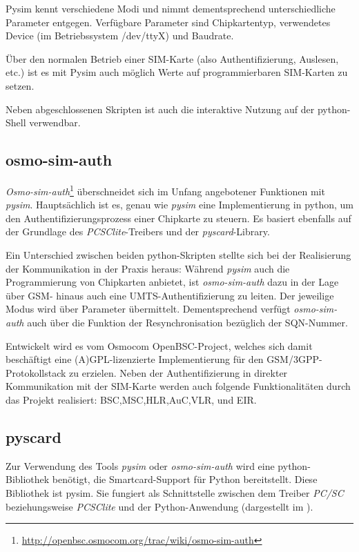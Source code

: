 Pysim kennt verschiedene Modi und nimmt dementsprechend unterschiedliche
Parameter entgegen. Verfügbare Parameter sind Chipkartentyp, verwendetes
Device (im Betriebssystem /dev/ttyX) und Baudrate\cite{pysimprince}.

Über den normalen Betrieb einer SIM-Karte (also Authentifizierung, Auslesen, etc.)
ist es mit Pysim auch möglich Werte auf programmierbaren SIM-Karten zu setzen.

Neben abgeschlossenen Skripten ist auch die interaktive Nutzung auf der
python-Shell verwendbar.

\subsection{osmo-sim-auth}
\label{subsec:osmosim}
\textit{Osmo-sim-auth}\footnote{\url{http://openbsc.osmocom.org/trac/wiki/osmo-sim-auth}}
überschneidet sich im Unfang angebotener Funktionen mit \textit{pysim}. Hauptsächlich ist es,
genau wie \textit{pysim} eine Implementierung in python, um den Authentifizierungsprozess
einer Chipkarte zu steuern. Es basiert ebenfalls auf der Grundlage des
\textit{PCSClite}-Treibers und der \textit{pyscard}-Library.

Ein Unterschied zwischen beiden python-Skripten stellte sich bei der
Realisierung der Kommunikation in der Praxis heraus:
Während \textit{pysim} auch die Programmierung von Chipkarten anbietet, ist
\textit{osmo-sim-auth} dazu in der Lage über \ac{GSM}- hinaus auch
eine \ac{UMTS}-Authentifizierung zu leiten.
Der jeweilige Modus wird über Parameter übermittelt.
Dementsprechend verfügt \textit{osmo-sim-auth} auch über die Funktion der
Resynchronisation bezüglich der \ac{SQN}-Nummer\cite{osmosimweb}.

Entwickelt wird es vom Osmocom OpenBSC-Project, welches sich damit
beschäftigt eine (A)GPL-lizenzierte Implementierung für den
GSM/3GPP-Protokollstack zu erzielen. Neben der Authentifizierung
in direkter Kommunikation mit der SIM-Karte werden auch folgende
Funktionalitäten durch das Projekt realisiert:
\ac{BSC},\ac{MSC},\ac{HLR},\ac{AuC},\ac{VLR}, und \ac{EIR}\cite{osmocombscweb}.

\subsection{pyscard}
Zur Verwendung des Tools \textit{pysim} oder \textit{osmo-sim-auth} wird eine python-Bibliothek benötigt,
die Smartcard-Support für Python bereitstellt. Diese Bibliothek
ist pysim. Sie fungiert als Schnittstelle zwischen dem Treiber \textit{PC/SC}
beziehungsweise \textit{PCSClite} und der Python-Anwendung 
(dargestellt im ).

